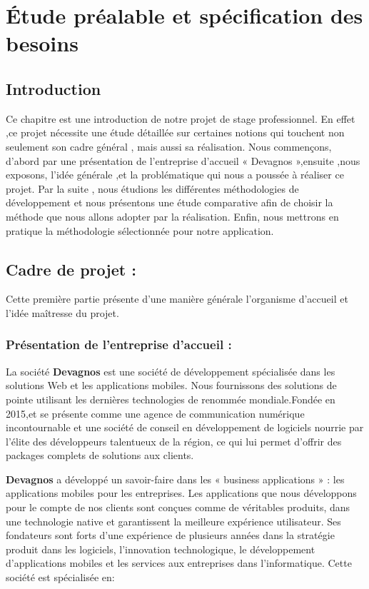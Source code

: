\documentclass[a4paper,10pt]{book}
\begin{document}
\chapter{Étude préalable et spécification des besoins}
\section*{Introduction} 
\renewcommand{\thesection}{\thechapter.\arabic{section}}
\par  
Ce chapitre est une introduction de notre projet de stage professionnel. En effet ,ce projet nécessite une étude détaillée sur certaines notions qui touchent non seulement son cadre général , mais aussi sa réalisation. 
Nous commençons, d'abord par une présentation de l’entreprise d’accueil « Devagnos »,ensuite ,nous exposons, l’idée générale ,et  la problématique qui nous a poussée à réaliser ce projet. 
Par la suite , nous étudions les différentes méthodologies de développement et nous présentons une étude comparative afin de choisir la méthode que nous allons adopter par la réalisation. Enfin, nous mettrons en pratique la méthodologie sélectionnée pour notre application.

\section {Cadre de projet :}
    Cette première partie présente d’une manière générale  l’organisme d’accueil et l'idée maîtresse du projet.
  
\subsection{Présentation de l’entreprise d’accueil : }
\par La société  \textbf{Devagnos} \cite{dirac} est une société de développement spécialisée dans les solutions Web et les applications mobiles. Nous fournissons des solutions de pointe utilisant les dernières technologies de renommée mondiale.Fondée en 2015,et se présente comme une agence de communication numérique incontournable et une société de conseil en développement de logiciels nourrie par l'élite des développeurs talentueux de la région, ce qui lui permet d'offrir des packages complets de solutions aux clients. 
     
      \textbf{Devagnos} a développé un savoir-faire dans les « business applications » : les applications mobiles pour les entreprises. Les applications que nous développons pour le compte de nos clients sont conçues comme de véritables produits, dans une technologie native et garantissent la meilleure expérience utilisateur.
Ses fondateurs sont forts d’une expérience de plusieurs années dans la stratégie produit dans les logiciels, l’innovation technologique, le développement d’applications mobiles et les services aux entreprises dans l’informatique. 
Cette société est spécialisée en:
\end{document}
